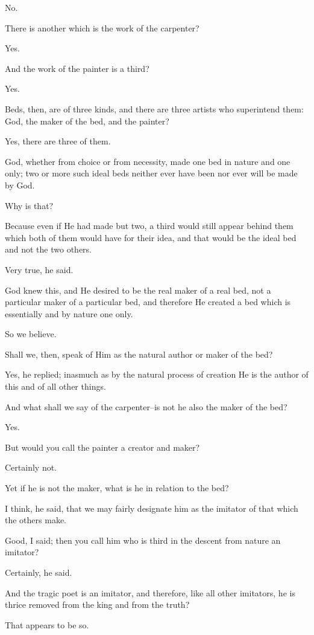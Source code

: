 No.

There is another which is the work of the carpenter?

Yes.

And the work of the painter is a third?

Yes.

Beds, then, are of three kinds, and there are three artists who
superintend them: God, the maker of the bed, and the painter?

Yes, there are three of them.

God, whether from choice or from necessity, made one bed in nature and
one only; two or more such ideal beds neither ever have been nor ever
will be made by God.

Why is that?

Because even if He had made but two, a third would still appear behind
them which both of them would have for their idea, and that would be the
ideal bed and not the two others.

Very true, he said.

God knew this, and He desired to be the real maker of a real bed, not
a particular maker of a particular bed, and therefore He created a bed
which is essentially and by nature one only.

So we believe.

Shall we, then, speak of Him as the natural author or maker of the bed?

Yes, he replied; inasmuch as by the natural process of creation He is
the author of this and of all other things.

And what shall we say of the carpenter--is not he also the maker of the
bed?

Yes.

But would you call the painter a creator and maker?

Certainly not.

Yet if he is not the maker, what is he in relation to the bed?

I think, he said, that we may fairly designate him as the imitator of
that which the others make.

Good, I said; then you call him who is third in the descent from nature
an imitator?

Certainly, he said.

And the tragic poet is an imitator, and therefore, like all other
imitators, he is thrice removed from the king and from the truth?

That appears to be so.

